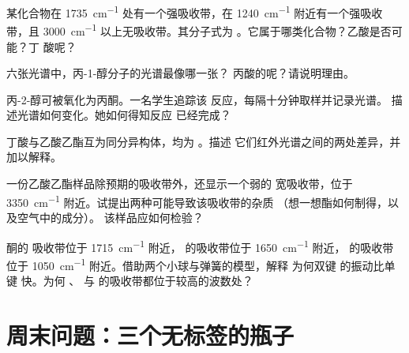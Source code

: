 \begin{exercise}[$\star\star$]\label{exo:g11:infrared:10}
某化合物在 \qty{1735}{cm^{-1}} 处有一个强吸收带，在
\qty{1240}{cm^{-1}} 附近有一个强吸收带，且 \qty{3000}{cm^{-1}} 以上无吸收带。其分子式为
。它属于哪类化合物？乙酸是否可能？丁
酸呢？
\end{exercise}

\begin{exercise}[$\star\star$]\label{exo:g11:infrared:11}
六张光谱中，丙-1-醇分子的光谱最像哪一张？
丙酸的呢？请说明理由。
\end{exercise}

\begin{exercise}[$\star\star\star$]\label{exo:g11:infrared:12}
丙-2-醇可被氧化为丙酮。一名学生追踪该
反应，每隔十分钟取样并记录光谱。
描述光谱如何变化。她如何得知反应
已经完成？
\end{exercise}

\begin{exercise}[$\star\star\star$]\label{exo:g11:infrared:13}
丁酸与乙酸乙酯互为同分异构体，均为 。描述
它们红外光谱之间的两处差异，并加以解释。
\end{exercise}

\begin{exercise}[$\star\star\star$]\label{exo:g11:infrared:14}
一份乙酸乙酯样品除预期的吸收带外，还显示一个弱的
宽吸收带，位于 \qty{3350}{cm^{-1}} 附近。试提出两种可能导致该吸收带的杂质
（想一想酯如何制得，以及空气中的成分）。
该样品应如何检验？
\end{exercise}

\begin{exercise}[$\star\star\star$]\label{exo:g11:infrared:15}
酮的  吸收带位于 \qty{1715}{cm^{-1}} 附近，
 的吸收带位于 \qty{1650}{cm^{-1}} 附近， 的吸收带
位于 \qty{1050}{cm^{-1}} 附近。借助两个小球与弹簧的模型，解释
为何双键  的振动比单键  快。为何 、 与
 的吸收带都位于较高的波数处？
\end{exercise}

\section{周末问题：三个无标签的瓶子}

